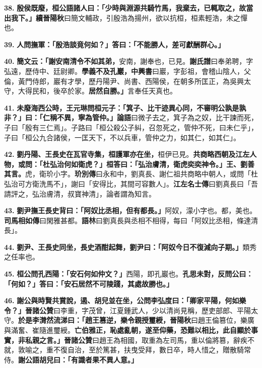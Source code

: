 \textbf{38.} \textbf{殷侯既廢，桓公語諸人曰：「少時與淵源共騎竹馬，我棄去，已輒取之，故當出我下。」}{\footnotesize \textbf{續晉陽秋}曰簡文輔政，引殷浩為揚州，欲以抗桓，桓素輕浩，未之憚也。}

\textbf{39.} \textbf{人問撫軍：「殷浩談竟何如？」答曰：「不能勝人，差可獻酬群心。」}

\textbf{40.} \textbf{簡文云：「謝安南清令不如其弟，}{\footnotesize 安南，謝奉也，已見。\textbf{謝氏譜}曰奉弟聘，字弘遠，歷侍中、廷尉卿。}\textbf{學義不及孔巖，}{\footnotesize \textbf{中興書}曰巖，字彭祖，會稽山陰人，父倫，黃門侍郎，巖有才學，歷丹陽尹、尚書、西陽侯，在朝多所匡正，為吳興太守，大得民和，後卒於家。}\textbf{居然自勝。」}{\footnotesize 言奉任天真也。}

\textbf{41.} \textbf{未廢海西公時，王元琳問桓元子：「箕子、比干迹異心同，不審明公孰是孰非？」曰：「仁稱不異，寧為管仲。」}{\footnotesize \textbf{論語}曰微子去之，箕子為之奴，比干諫而死，子曰「殷有三仁焉」。子路曰「桓公殺公子糾，召忽死之，管仲不死，曰未仁乎」，子曰「桓公九合諸侯，一匡天下，不以兵車，管仲之力，如其仁，如其仁」。}

\textbf{42.} \textbf{劉丹陽、王長史在瓦官寺集，桓護軍亦在坐，}{\footnotesize 桓伊已見。}\textbf{共商略西朝及江左人物，或問：「杜弘治何如衛虎？」桓答曰：「弘治膚清，衛虎奕奕神令。」王、劉善其言。}{\footnotesize 虎，衛玠小字。\textbf{玠別傳}曰永和中，劉真長、謝仁祖共商略中朝人，或問「杜弘治可方衛洗馬不」，謝曰「安得比，其間可容數人」。\textbf{江左名士傳}曰劉真長曰「吾請評之，弘治膚清，叔寶神清」，論者謂為知言。}

\textbf{43.} \textbf{劉尹撫王長史背曰：「阿奴比丞相，但有都長。」}{\footnotesize 阿奴，濛小字也。都，美也。\textbf{司馬相如傳}曰閑雅甚都。\textbf{語林}曰劉真長與丞相不相得，每曰「阿奴比丞相，條達清長」。}

\textbf{44.} \textbf{劉尹、王長史同坐，長史酒酣起舞，劉尹曰：「阿奴今日不復減向子期。」}{\footnotesize 類秀之任率也。}

\textbf{45.} \textbf{桓公問孔西陽：「安石何如仲文？」}{\footnotesize 西陽，即孔巖也。}\textbf{孔思未對，反問公曰：「何如？」答曰：「安石居然不可陵踐，其處故勝也。」}

\textbf{46.} \textbf{謝公與時賢共賞說，遏、胡兒並在坐，公問李弘度曰：「卿家平陽，何如樂令？」}{\footnotesize \textbf{晉諸公贊}曰李重，字茂曾，江夏鍾武人，少以清尚見稱，歷吏部郎、平陽太守。}\textbf{於是李潸然流涕曰：「趙王篡逆，樂令親授璽綬，}{\footnotesize \textbf{晉陽秋}曰趙王倫篡位，樂廣與滿奮、崔隨進璽綬。}\textbf{亡伯雅正，恥處亂朝，遂至仰藥，恐難以相比，此自顯於事實，非私親之言。」}{\footnotesize \textbf{晉諸公贊}曰趙王為相國，取重為左司馬，重以倫將篡，辭疾不就，敦喻之，重不復自治，至於篤甚，扶曳受拜，數日卒，時人惜之，贈散騎常侍。}\textbf{謝公語胡兒曰：「有識者果不異人意。」}

